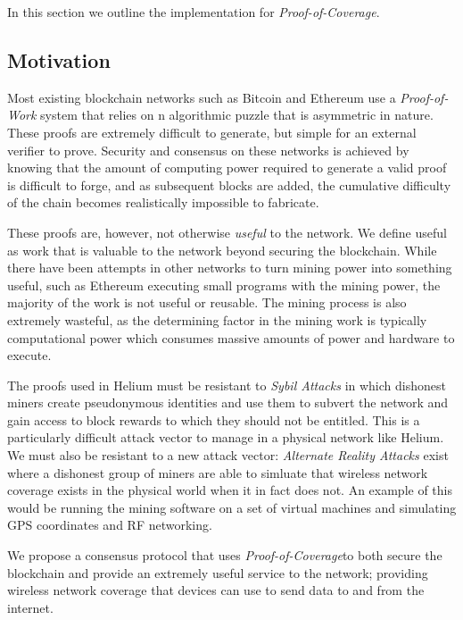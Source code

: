 \documentclass[letterpaper,11pt]{article}
\newcommand{\proofofcoverage}{\textit{Proof-of-Coverage}}
\begin{document}
In this section we outline the implementation for \proofofcoverage.

\subsection{Motivation}

Most existing blockchain networks such as Bitcoin \cite{bitcoin} and Ethereum \cite{ethereum} use a \textit{Proof-of-Work} system that relies on n algorithmic puzzle that is asymmetric in nature. These proofs are extremely difficult to generate, but simple for an external verifier to prove. Security and consensus on these networks is achieved by knowing that the amount of computing power required to generate a valid proof is difficult to forge, and as subsequent blocks are added, the cumulative difficulty of the chain becomes realistically impossible to fabricate. \newline

These proofs are, however, not otherwise \textit{useful} to the network. We define useful as work that is valuable to the network beyond securing the blockchain. While there have been attempts in other networks to turn mining power into something useful, such as Ethereum executing small programs with the mining power, the majority of the work is not useful or reusable. The mining process is also extremely wasteful, as the determining factor in the mining work is typically computational power which consumes massive amounts of power and hardware to execute.\newline

The proofs used in Helium must be resistant to \textit{Sybil Attacks} in which dishonest miners create pseudonymous identities and use them to subvert the network and gain access to block rewards to which they should not be entitled. This is a particularly difficult attack vector to manage in a physical network like Helium. We must also be resistant to a new attack vector: \textit{Alternate Reality Attacks} exist where a dishonest group of miners are able to simluate that wireless network coverage exists in the physical world when it in fact does not. An example of this would be running the mining software on a set of virtual machines and simulating GPS coordinates and RF networking.\newline

We propose a consensus protocol that uses \proofofcoverage to both secure the blockchain and provide an extremely useful service to the network; providing wireless network coverage that devices can use to send data to and from the internet. 
\end{document}
